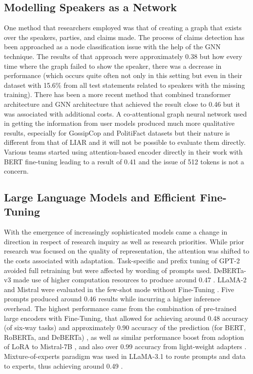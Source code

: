 \subsection{Modelling Speakers as a Network}

One method that researchers employed was that of creating a graph that exists over the speakers, parties, and claims made. The process of claims detection has been approached as a node classification issue with the help of the GNN technique. The results of that approach were approximately 0.38 but how every time where the graph failed to show the speaker, there was a decrease in performance (which occurs quite often not only in this setting but even in their dataset with 15.6\% from all test statements related to speakers with the missing training). There has been a more recent method that combined transformer architecture and GNN architecture that achieved the result close to 0.46 but it was associated with additional costs. A co-attentional graph neural network used in getting the information from user models produced much more qualitative results, especially for GossipCop and PolitiFact datasets but their nature is different from that of LIAR and it will not be possible to evaluate them directly. Various teams started using attention-based encoder directly in their work with BERT fine-tuning leading to a result of 0.41 and the issue of 512 tokens is not a concern.

\subsection{Large Language Models and Efficient Fine-Tuning}

With the emergence of increasingly sophisticated models came a change in direction in respect of research inquiry as well as research priorities. While prior research was focused on the quality of representation, the attention was shifted to the costs associated with adaptation. Task-specific and prefix tuning of GPT-2 avoided full retraining \cite{zhou2023fine} but were affected by wording of prompts used. DeBERTa-v3 made use of higher computation resources to produce around 0.47 \cite{martinez2024deberta}. LLaMA-2 and Mistral were evaluated in the few-shot mode without Fine-Tuning \cite{kumar2024combating}. Five prompts produced around 0.46 results while incurring a higher inference overhead. The highest performance came from the combination of pre-trained large encoders with Fine-Tuning, that allowed for achieving around 0.48 accuracy (of six-way tasks) and approximately 0.90 accuracy of the prediction (for BERT, RoBERTa, and DeBERTa) \cite{alqadi2025transfer}, as well as similar performance boost from adoption of LoRA to Mistral-7B \cite{thompson2025parameter}, and also over 0.99 accuracy from light-weight adapters \cite{alghamdi2025abert}. Mixture-of-experts paradigm was used in LLaMA-3.1 to route prompts and data to experts, thus achieving around 0.49 \cite{garcia2026hybrid}.

